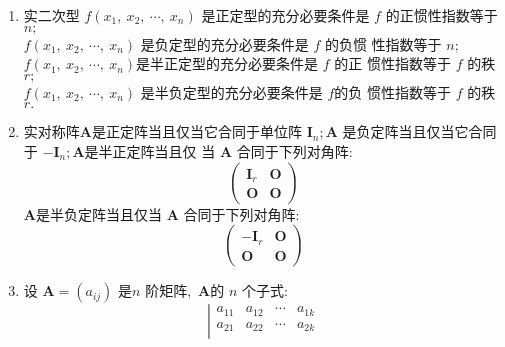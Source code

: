 \begin{enumerate}
		(3) 若对任意 $ n $ 维非零列向量  $\boldsymbol{\alpha}  $均有  $\boldsymbol{\alpha}^{\prime} \boldsymbol{A} \boldsymbol{\alpha} \geqslant 0 ,\ $ 则称$  f $ 是半正定二次型 (简称半正定型),\  矩阵 $ \boldsymbol{A} $ 称为半正定 矩阵 (简称半正定阵);\\
		(4) 若对任意  $n$  维非零列向量 $ \boldsymbol{\alpha} $ 均有  $\boldsymbol{\alpha}^{\prime} \boldsymbol{A} \boldsymbol{\alpha} \leqslant 0 ,\  $则称 $ f $ 是半负定二次型 (简称半负定型),\  矩阵 $ \boldsymbol{A} $ 称为半负定 矩阵 (简称半负定阵);\\
		(5) 若存在  $\boldsymbol{\alpha} ,\  $使  $\boldsymbol{\alpha}^{\prime} \boldsymbol{A} \boldsymbol{\alpha}>0 ; $又存在 $ \boldsymbol{\beta} ,\ $ 使 $ \boldsymbol{\beta} \boldsymbol{A} \boldsymbol{\beta}<0 ,\ $ 则称 $ f $ 是不定型.
		\item 实二次型  $f\left(x_{1},\  x_{2},\  \cdots,\  x_{n}\right)$  是正定型的充分必要条件是 $ f $ 的正惯性指数等于 $ n ;$\\
		$f\left(x_{1},\  x_{2},\  \cdots,\  x_{n}\right) $ 是负定型的充分必要条件是  $f$  的负惯 性指数等于  $n ;$\\
		$f\left(x_{1},\  x_{2},\  \cdots,\  x_{n}\right)  $是半正定型的充分必要条件是  $f $ 的正 惯性指数等于  $f$  的秩  $r ;$\\
		$f\left(x_{1},\  x_{2},\  \cdots,\  x_{n}\right) $ 是半负定型的充分必要条件是  $f  $的负 惯性指数等于  $f$ 的秩  $r .$
		\item 实对称阵$  \boldsymbol{A}  $是正定阵当且仅当它合同于单位阵 $ \boldsymbol{I}_{n}; \boldsymbol{A} $ 是负定阵当且仅当它合同于 $ -\boldsymbol{I}_{n} ; \boldsymbol{A}  $是半正定阵当且仅 当 $ \boldsymbol{A}$  合同于下列对角阵:
		$$\left(\begin{array}{ll}
			\boldsymbol{I}_{r} & \boldsymbol{O} \\
			\boldsymbol{O} & \boldsymbol{O}
		\end{array}\right)$$
		$\boldsymbol{A}$是半负定阵当且仅当  $\boldsymbol{A}$  合同于下列对角阵:
		$$\left(\begin{array}{cc}
			-\boldsymbol{I}_{r} & \boldsymbol{O} \\
			\boldsymbol{O} & \boldsymbol{O}
		\end{array}\right)$$
		\item 设 $ \boldsymbol{A}=\left(a_{i j}\right) $ 是$  n $ 阶矩阵,\   $\boldsymbol{A}  $的  $n$  个子式:
		$$\left|\begin{array}{cccc}
			a_{11} & a_{12} & \cdots & a_{1 k} \\
			a_{21} & a_{22} & \cdots & a_{2 k} \\

\end{array}$$
\end{enumerate}
